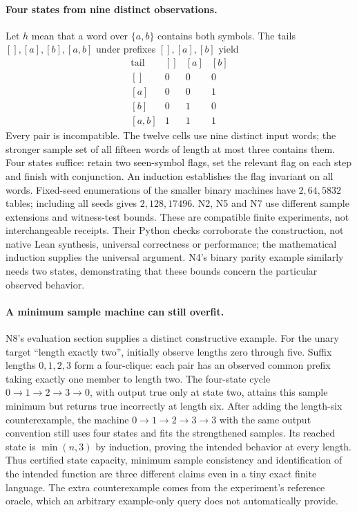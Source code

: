 \paragraph{Four states from nine distinct observations.}
Let $h$ mean that a word over $\{a,b\}$ contains both symbols. The tails
$[],[a],[b],[a,b]$ under prefixes $[],[a],[b]$ yield
\[
\begin{array}{c|ccc}
\text{tail} & [] &[a]&[b]\\\hline
{[]}&0&0&0\\
{[a]}&0&0&1\\
{[b]}&0&1&0\\
{[a,b]}&1&1&1
\end{array}
\]
Every pair is incompatible. The twelve cells use nine distinct input words;
the stronger sample set of all fifteen words of length at most three contains
them. Four states suffice: retain two seen-symbol flags, set the relevant flag
on each step and finish with conjunction. An induction establishes the flag
invariant on all words. Fixed-seed enumerations of the smaller binary machines
have $2,64,5832$ tables; including all seeds gives $2,128,17496$.
N2, N5 and N7 use different sample extensions and witness-test bounds. These
are compatible finite experiments, not interchangeable receipts. Their Python
checks corroborate the construction, not native Lean synthesis, universal
correctness or performance; the mathematical induction supplies the universal
argument. N4's binary parity example similarly needs two states, demonstrating
that these bounds concern the particular observed behavior.

\paragraph{A minimum sample machine can still overfit.}
\label{sec:carrier-minimum-overfit}
N8's evaluation section supplies a distinct constructive example. For the unary
target ``length exactly two'', initially observe lengths zero through five.
Suffix lengths $0,1,2,3$ form a four-clique: each pair has an observed common
prefix taking exactly one member to length two. The four-state cycle
$0\to1\to2\to3\to0$, with output true only at state two, attains this
sample minimum but returns true incorrectly at length six. After adding the
length-six counterexample, the machine
$0\to1\to2\to3\to3$ with the same output convention still uses four states
and fits the strengthened samples. Its reached state is $\min(n,3)$ by
induction, proving the intended behavior at every length. Thus certified state
capacity, minimum sample consistency and identification of the intended
function are three different claims even in a tiny exact finite language.
The extra counterexample comes from the experiment's reference oracle, which
an arbitrary example-only query does not automatically provide.

